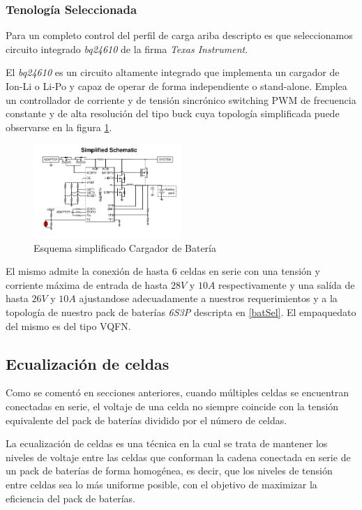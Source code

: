 \documentclass[10pt,a4paper]{article}
\begin{document}
\subsubsection{Tenología Seleccionada}

Para un completo control del perfil de carga ariba descripto es que
seleccionamos circuito integrado \emph{bq24610} de la firma \emph{Texas
Instrument}.

El \emph{bq24610} es un circuito altamente integrado que implementa un cargador
de \acrfull{Ion-Li} o \acrfull{Li-Po} y capaz de operar de forma independiente o
stand-alone. Emplea un controllador de corriente y de tensión sincrónico
switching PWM de frecuencia constante y de alta resolución del tipo buck cuya
topología simplificada puede observarse en la figura \ref{fig:simp_sch_char}. 

\begin{figure}[h!]
    \centering
    \includegraphics[width=0.5\textwidth]{bat_char/simp_sch_char.png}
    \caption{Esquema simplificado Cargador de Batería}
    \label{fig:simp_sch_char}
\end{figure}
\FloatBarrier

El mismo admite la conexión de hasta 6 celdas en serie con una tensión y
corriente máxima de entrada de hasta $28V$ y $10A$ respectivamente y una salída
de hasta $26V$ y $10A$ ajustandose adecuadamente a nuestros requerimientos y a
la topología de nuestro pack de baterías \emph{6S3P} descripta en \ref{batSel}.
El empaquedato del mismo es del tipo VQFN.

\subsection{Ecualización de celdas}

\noindent Como se comentó en secciones anteriores, cuando múltiples celdas se
encuentran conectadas en serie, el voltaje de una celda no siempre coincide con
la tensión equivalente del pack de baterías dividido por el número de celdas. 

\noindent La ecualización de celdas es una técnica en la cual se trata de
mantener los niveles de voltaje entre las celdas que conforman la cadena
conectada en serie de un pack de baterías de forma homogénea, es decir, que los
niveles de tensión entre celdas sea lo más uniforme posible, con el objetivo de
maximizar la eficiencia del pack de baterías.
\end{document}
